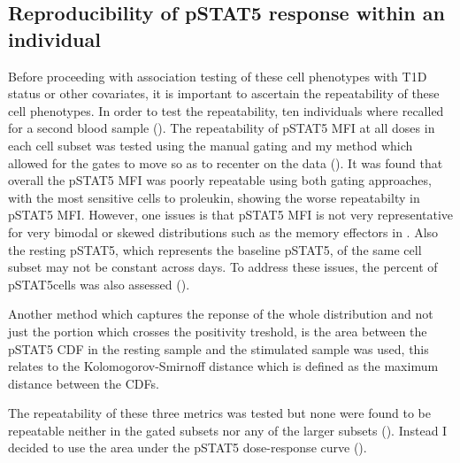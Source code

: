 \subsection{Reproducibility of pSTAT5 response within an individual}

Before proceeding with association testing of these cell phenotypes with T1D status or other covariates,
it is important to ascertain the repeatability of these cell phenotypes.
In order to test the repeatability, ten individuals where recalled for a second blood sample ().
The repeatability of pSTAT5 MFI at all doses in each cell subset was tested using the manual gating and my method which allowed for
the gates to move so as to recenter on the data ().
It was found that overall the pSTAT5 MFI was poorly repeatable using both gating approaches,
with the most sensitive cells to proleukin, showing the worse repeatabilty in pSTAT5 MFI.
However, one issues is that pSTAT5 MFI is not very representative for very bimodal or skewed distributions such
as the memory effectors in .
Also the resting pSTAT5, which represents the baseline pSTAT5, of the same cell subset may not be constant across days.  
To address these issues, the percent of pSTAT5\positive cells was also assessed ().

Another method which captures the reponse of the whole distribution and not just the portion which crosses the positivity treshold,
is the area between the pSTAT5 CDF in the resting sample and the stimulated sample was used,
this relates to the Kolomogorov-Smirnoff distance which is defined as the maximum distance between the CDFs.


The repeatability of these three metrics was tested but none were found to be repeatable neither in the gated subsets nor any of the larger subsets ().
Instead I decided to use the area under the pSTAT5 dose-response curve ().

